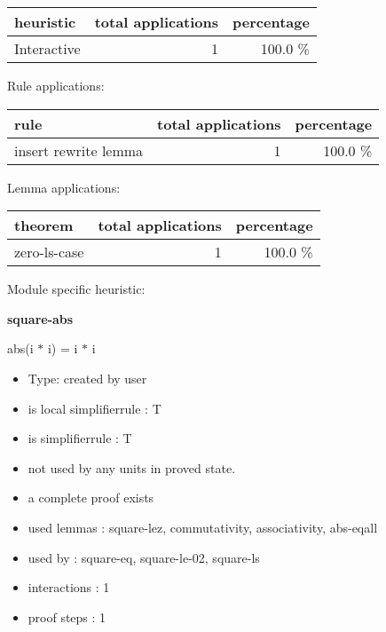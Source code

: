\documentclass[a4paper]{article}
\begin{document}
\begin{supertabular}{l|r|r}
heuristic	& total applications & percentage \\ \hline
Interactive & 1 & 100.0 \% \\

\end{supertabular}

Rule applications:

\begin{supertabular}{l|r|r}
rule	        & total applications & percentage \\ \hline
insert rewrite lemma & 1 & 100.0 \% \\

\end{supertabular}

Lemma applications:

\begin{supertabular}{l|r|r}
theorem	        & total applications & percentage \\ \hline
zero-ls-case & 1 & 100.0 \% \\

\end{supertabular}

Module specific heuristic:

\pagebreak

{\LARGE\bf square-abs}\label{lemma-square-abs}

\medskip

 \Fol abs(i $*$ i) = i $*$ i

\begin{itemize}

\item Type: created by user

\item is local simplifierrule : T
\item is simplifierrule : T
\item not used by any units in proved state.
\item       a complete proof exists
\item       used lemmas  : square-lez, commutativity, associativity, abs-eqall
\item       used by      : square-eq, square-le-02, square-ls
\item       interactions : 1
\item       proof steps  : 1
\end{itemize}

\medskip
\end{document}
